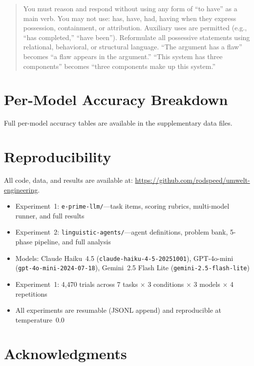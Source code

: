 \documentclass[11pt,a4paper]{article}
\begin{document}
\begin{quote}
You must reason and respond without using any form of ``to have'' as a main verb. You may not use: has, have, had, having when they express possession, containment, or attribution. Auxiliary uses are permitted (e.g., ``has completed,'' ``have been''). Reformulate all possessive statements using relational, behavioral, or structural language. ``The argument has a flaw'' becomes ``a flaw appears in the argument.'' ``This system has three components'' becomes ``three components make up this system.''
\end{quote}

\section{Per-Model Accuracy Breakdown}

Full per-model accuracy tables are available in the supplementary data files.

\section{Reproducibility}

All code, data, and results are available at: \url{https://github.com/rodspeed/umwelt-engineering}.

\begin{itemize}[nosep]
  \item Experiment~1: \texttt{e-prime-llm/}---task items, scoring rubrics, multi-model runner, and full results
  \item Experiment~2: \texttt{linguistic-agents/}---agent definitions, problem bank, 5-phase pipeline, and full analysis
  \item Models: Claude Haiku~4.5 (\texttt{claude-haiku-4-5-20251001}), GPT-4o-mini (\texttt{gpt-4o-mini-2024-07-18}), Gemini~2.5 Flash Lite (\texttt{gemini-2.5-flash-lite})
  \item Experiment~1: 4,470 trials across 7 tasks $\times$ 3 conditions $\times$ 3 models $\times$ 4 repetitions
  \item All experiments are resumable (JSONL append) and reproducible at temperature~0.0
\end{itemize}

\section*{Acknowledgments}
\end{document}

